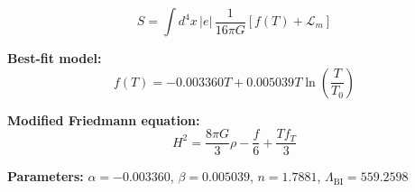 
\begin{equation}
  S = \int d^4x \, |e| \, \frac{1}{16\pi G} \left[ f(T) + \mathcal{L}_m \right]
\end{equation}

\textbf{Best-fit model:}
\begin{equation}
  f(T) = -0.003360 T + 0.005039 T \ln\!\left(\frac{T}{T_0}\right)
\end{equation}

\textbf{Modified Friedmann equation:}
\begin{equation}
  H^2 = \frac{8\pi G}{3} \rho - \frac{f}{6} + \frac{T f_T}{3}
\end{equation}

\textbf{Parameters:}
$\alpha = -0.003360$, \quad
$\beta = 0.005039$, \quad
$n = 1.7881$, \quad
$\Lambda_{\text{BI}} = 559.2598$